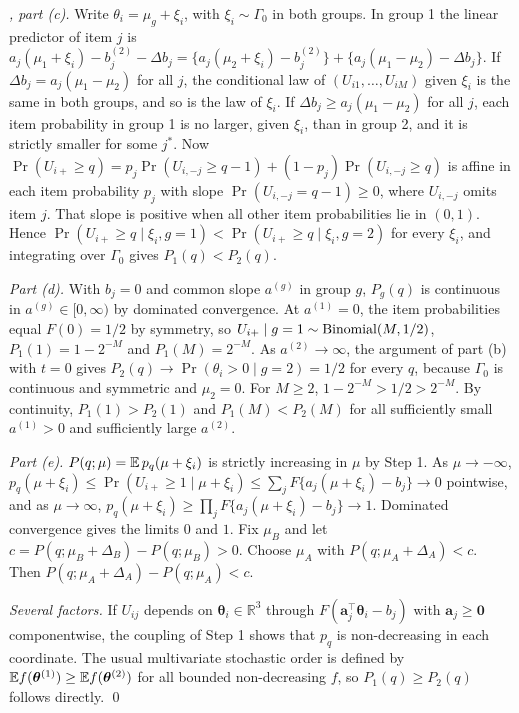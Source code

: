 \emph{, part (c).} Write $\theta_i=\mu_g+\xi_i$, with $\xi_i\sim \Gamma_0$ in both groups. In group 1 the linear predictor of item $j$ is $a_j(\mu_1+\xi_i)-b^{(2)}_j-\Delta b_j=\{a_j(\mu_2+\xi_i)-b^{(2)}_j\}+\{a_j(\mu_1-\mu_2)-\Delta b_j\}$. If $\Delta b_j=a_j(\mu_1-\mu_2)$ for all $j$, the conditional law of $(U_{i1},\dots,U_{iM})$ given $\xi_i$ is the same in both groups, and so is the law of $\xi_i$. If $\Delta b_j\ge a_j(\mu_1-\mu_2)$ for all $j$, each item probability in group 1 is no larger, given $\xi_i$, than in group 2, and it is strictly smaller for some $j^*$. Now $\Pr(U_{i+}\ge q)=p_{j}\Pr(U_{i,-j}\ge q-1)+(1-p_j)\Pr(U_{i,-j}\ge q)$ is affine in each item probability $p_j$ with slope $\Pr(U_{i,-j}=q-1)\ge0$, where $U_{i,-j}$ omits item $j$. That slope is positive when all other item probabilities lie in $(0,1)$. Hence $\Pr(U_{i+}\ge q\mid\xi_i,g=1)<\Pr(U_{i+}\ge q\mid\xi_i,g=2)$ for every $\xi_i$, and integrating over $\Gamma_0$ gives $P_1(q)<P_2(q)$.

\emph{Part (d).} With $b_j=0$ and common slope $a^{(g)}$ in group $g$, $P_g(q)$ is continuous in $a^{(g)}\in[0,\infty)$ by dominated convergence. At $a^{(1)}=0$, the item probabilities equal $F(0)=1/2$ by symmetry, so $U_{i+}\mid g=1\sim\operatorname{Binomial}(M,1/2)$, $P_1(1)=1-2^{-M}$ and $P_1(M)=2^{-M}$. As $a^{(2)}\to\infty$, the argument of part (b) with $t=0$ gives $P_2(q)\to\Pr(\theta_i>0\mid g=2)=1/2$ for every $q$, because $\Gamma_0$ is continuous and symmetric and $\mu_2=0$. For $M\ge2$, $1-2^{-M}>1/2>2^{-M}$. By continuity, $P_1(1)>P_2(1)$ and $P_1(M)<P_2(M)$ for all sufficiently small $a^{(1)}>0$ and sufficiently large $a^{(2)}$.

\emph{Part (e).} $P(q;\mu)=\mathbb{E}\,p_q(\mu+\xi_i)$ is strictly increasing in $\mu$ by Step 1. As $\mu\to-\infty$, $p_q(\mu+\xi_i)\le\Pr(U_{i+}\ge1\mid\mu+\xi_i)\le\sum_jF\{a_j(\mu+\xi_i)-b_j\}\to0$ pointwise, and as $\mu\to\infty$, $p_q(\mu+\xi_i)\ge\prod_jF\{a_j(\mu+\xi_i)-b_j\}\to1$. Dominated convergence gives the limits $0$ and $1$. Fix $\mu_B$ and let $c=P(q;\mu_B+\Delta_B)-P(q;\mu_B)>0$. Choose $\mu_A$ with $P(q;\mu_A+\Delta_A)<c$. Then $P(q;\mu_A+\Delta_A)-P(q;\mu_A)<c$.

\emph{Several factors.} If $U_{ij}$ depends on $\bm\theta_i\in\mathbb R^3$ through $F(\bm a_j^\top\bm\theta_i-b_j)$ with $\bm a_j\ge\bm0$ componentwise, the coupling of Step 1 shows that $p_q$ is non-decreasing in each coordinate. The usual multivariate stochastic order is defined by $\mathbb{E} f(\bm\theta^{(1)})\ge\mathbb{E} f(\bm\theta^{(2)})$ for all bounded non-decreasing $f$, so $P_1(q)\ge P_2(q)$ follows directly. \qed
